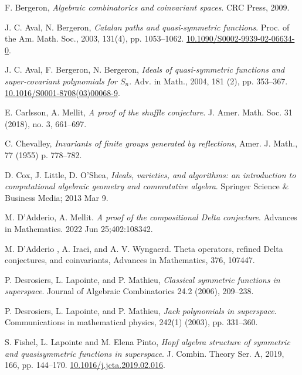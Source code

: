 \documentclass[11pt,oneside]{amsart}
\theoremstyle{definition}
\numberwithin{equation}{section}
\begin{document}
\begin{thebibliography}{999}

 F. Bergeron,
\textit{Algebraic combinatorics and coinvariant spaces}.
CRC Press, 2009.

 J. C. Aval, N. Bergeron,
\textit{Catalan paths and quasi-symmetric functions}.
Proc. of the Am. Math. Soc., 2003, 131(4), pp. 1053--1062.
\href{https://doi.org/10.1090/S0002-9939-02-06634-0}{10.1090/S0002-9939-02-06634-0}.

 J. C. Aval, F. Bergeron, N. Bergeron,
\textit{Ideals of quasi-symmetric functions and super-covariant polynomials for $S_n$}.
Adv. in Math., 2004, 181 (2), pp. 353--367.
\href{https://doi.org/10.1016/S0001-8708(03)00068-9}{10.1016/S0001-8708(03)00068-9}.

 E. Carlsson, A. Mellit,
\textit{A proof of the shuffle conjecture}.
J. Amer. Math. Soc. 31 (2018), no. 3, 661--697.

 C. Chevalley,
\textit {Invariants of finite groups generated by reflections},
Amer. J. Math., 77 (1955) p. 778--782.

 D. Cox, J. Little, D. O'Shea,
\textit{Ideals, varieties, and algorithms: an introduction to computational
algebraic geometry and commutative algebra}.
Springer Science \& Business Media; 2013 Mar 9.

 M. D'Adderio, A. Mellit.
\textit{A proof of the compositional Delta conjecture}.
Advances in Mathematics. 2022 Jun 25;402:108342.

 M. D'Adderio , A. Iraci, and A. V. Wyngaerd.
Theta operators, refined Delta conjectures, and coinvariants,
Advances in Mathematics, 376, 107447.

 P. Desrosiers, L. Lapointe, and P. Mathieu,
\textit{Classical symmetric functions in superspace}.
Journal of Algebraic Combinatorics 24.2 (2006), 209--238.

 P. Desrosiers, L. Lapointe, and P. Mathieu,
\textit{Jack polynomials in superspace}.
Communications in mathematical physics, 242(1) (2003), pp. 331--360.

S. Fishel, L. Lapointe and M. Elena Pinto,
\textit{Hopf algebra structure of symmetric and quasisymmetric functions in superspace}.
 {J. Combin. Theory Ser. A}, 2019, 166, pp.  {144--170}.
\href{https://doi-org/10.1016/j.jcta.2019.02.016}{10.1016/j.jcta.2019.02.016}.


\end{thebibliography}
\end{document}
